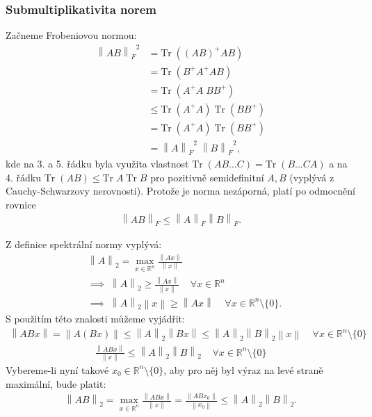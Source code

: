 \documentclass[]{article}
\newcommand{\R}{\mathbb{R}}
\newcommand{\Tr}{\mathrm{Tr}\;}
\newcommand{\norm}[1]{\left\lVert#1\right\rVert}
\begin{document}
\subsubsection{Submultiplikativita norem}
Začneme Frobeniovou normou:
\begin{align*}
  {\norm{AB}_F}^2
  &= \Tr( (AB)^+ AB ) \\
  &= \Tr(B^+A^+AB) \\
  &= \Tr(A^+A \; BB^+) \\
  &\leq \Tr(A^+A) \; \Tr(BB^+) \\
  &= \Tr(A^+A) \; \Tr(BB^+) \\
  &= {\norm{A}_F}^2 \; {\norm{B}_F}^2,
\end{align*}
kde na 3. a 5. řádku byla využita vlastnost $\Tr(AB...C) = \Tr(B...CA)$ a na 4. řádku $\Tr(AB) \leq \Tr A \; \Tr B$ pro pozitivně semidefinitní $A,B$ (vyplývá z Cauchy-Schwarzovy nerovnosti). Protože je norma nezáporná, platí po odmocnění rovnice
\begin{align*}
  \norm{AB}_F \leq \norm{A}_F \norm{B}_F.
\end{align*}

\bigskip

Z definice spektrální normy vyplývá:
\begin{align*}
  &\norm{A}_2 = \max_{x \in \R^n} \frac{\norm{Ax}}{\norm{x}} \\
  &\implies \; \norm{A}_2 \geq \frac{\norm{Ax}}{\norm{x}} \;\;\;\; \forall x \in \R^n \\
  &\implies \; \norm{A}_2 \norm{x} \geq \norm{Ax} \;\;\;\; \forall x \in \R^n \setminus \{0\}.
\end{align*}
S použitím této znalosti můžeme vyjádřit:
\begin{align*}
  \norm{ABx} = \norm{A(Bx)} \leq \norm{A}_2 \norm{Bx} \leq \norm{A}_2 \norm{B}_2 \norm{x} \;\;\;\; \forall x \in \R^n \setminus \{0\}
\end{align*}
\begin{align*}
  \frac{\norm{ABx}}{\norm{x}} \leq \norm{A}_2 \norm{B}_2 \;\;\;\; \forall x \in \R^n \setminus \{0\}
\end{align*}
Vybereme-li nyní takové $x_0 \in \R^n \setminus \{0\}$, aby pro něj byl výraz na levé straně maximální, bude platit:
\begin{align*}
  \norm{AB}_2 = \max_{x \in \R^n} \frac{\norm{ABx}}{\norm{x}} = \frac{\norm{ABx_0}}{\norm{x_0}} \leq \norm{A}_2 \norm{B}_2.
\end{align*}


\endgroup
\end{document}
